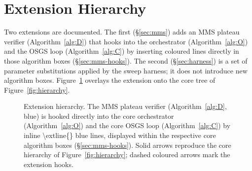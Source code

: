 \documentclass{article}
\newcommand{\extline}[1]{{\color{extcolor}#1}}
\begin{document}
\section{Extension Hierarchy}

Two extensions are documented. The first
(§\ref{sec:mms}) adds an MMS plateau verifier (Algorithm~\ref{alg:D})
that hooks into the orchestrator (Algorithm~\ref{alg:O}) and the OSGS
loop (Algorithm~\ref{alg:C}) by inserting coloured \extline{\extline{}}
lines directly in those algorithm boxes (§\ref{sec:mms-hooks}). The
second (§\ref{sec:harness}) is a set of parameter substitutions applied
by the sweep harness; it does not introduce new algorithm boxes.
Figure~\ref{fig:ext-hierarchy} overlays the extension onto the core
tree of Figure~\ref{fig:hierarchy}.

\begin{figure}[h]
\centering
{}
\caption{Extension hierarchy. The MMS plateau verifier
(\extline{Algorithm~\ref{alg:D}}, blue) is hooked directly into the
core orchestrator (Algorithm~\ref{alg:O}) and the core OSGS loop
(Algorithm~\ref{alg:C}) by inline \extline{\textbackslash extline\{\}}
blue lines, displayed within the respective core algorithm boxes
(§\ref{sec:mms-hooks}). Solid arrows reproduce the core hierarchy of
Figure~\ref{fig:hierarchy}; \extline{dashed coloured arrows} mark the
extension hooks.}
\label{fig:ext-hierarchy}
\end{figure}
\end{document}
